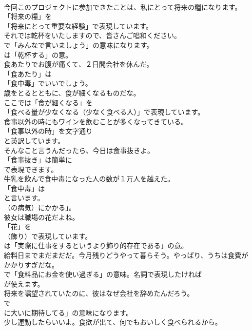 \documentclass[8pt]{extreport}
\begin{document}
\begin{CJK}{UTF8}{min}
\\	今回このプロジェクトに参加できたことは、私にとって将来の糧になります。 
\\	「将来の糧」を
\\	「将来にとって重要な経験」で表現しています。	
\\	それでは乾杯をいたしますので、皆さんご唱和ください。 
\\	で「みんなで言いましょう」の意味になります。
\\	は「乾杯する」の意。	
\\	食あたりでお腹が痛くて、２日間会社を休んだ。 
\\	「食あたり」は
\\	「食中毒」でいいでしょう。	
\\	歳をとるとともに、食が細くなるものだな。 
\\	ここでは「食が細くなる」を
\\	「食べる量が少なくなる（少なく食べる人）」で表現しています。	
\\	食事以外の時にもワインを飲むことが多くなってきている。 
\\	「食事以外の時」を文字通り
\\	と英訳しています。	
\\	そんなこと言うんだったら、今日は食事抜きよ。 
\\	「食事抜き」は簡単に
\\	で表現できます。	
\\	牛乳を飲んで食中毒になった人の数が１万人を越えた。 
\\	「食中毒」は
\\	と言います。
\\	（の病気）にかかる」。	
\\	彼女は職場の花だよね。 
\\	「花」を 
\\	（飾り）で表現しています。
\\	は「実際に仕事をするというより飾り的存在である」の意。	
\\	給料日までまだまだだ。今月残りどうやって暮らそう。やっぱり、うちは食費がかかりすぎだな。 
\\	で「食料品にお金を使い過ぎる」の意味。名詞で表現したければ
\\	が使えます。	
\\	将来を嘱望されていたのに、彼はなぜ会社を辞めたんだろう。 
\\	で
\\	に大いに期待してる」の意味になります。	
\\	少し運動したらいいよ。食欲が出て、何でもおいしく食べられるから。 

\end{CJK}
\end{document}
